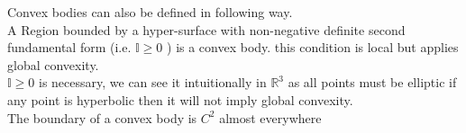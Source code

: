 \documentclass[oneside]{book}
\theoremstyle{definition}
\begin{document}
Convex bodies can also be defined in following way.\\
     A Region  bounded by a hyper-surface with non-negative definite second fundamental form (i.e. $\mathbb{I} \geq 0 $ ) is a convex body. this condition is local but  applies global convexity. \\
     $\mathbb{I} \geq 0 $ is necessary, we can see it intuitionally in  $\mathbb{R}^3$ as all points must be elliptic if any point is hyperbolic then it will not imply global convexity. \\
     The boundary of a convex body is $C^{2}$ almost everywhere   \\\\
     
     
 
 
 
 
 
 
 
\end{document}
